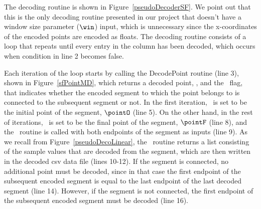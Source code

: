 \vspace{+5pt}



\clearpage




\vspace{-5pt}


The decoding routine is shown in Figure~\ref{pseudoDecoderSF}. We point out that this is the only decoding routine presented in our project that doesn't have a window size parameter ($\win$) input, which is unnecessary since the x-coordinates of the encoded points are encoded as floats. The decoding routine consists of a loop that repeats until every entry in the column has been decoded, which occurs when condition in line 2 becomes false. 





Each iteration of the loop starts by calling the DecodePoint routine (line 3), shown in Figure~\ref{sfPointMD}, which returns a decoded point, \pointP, and the \connected\ flag, that indicates whether the encoded segment to which the point belongs to is connected to the subsequent segment or not.  In the first iteration, \pointP\ is set to be the initial point of the segment, $\pointO$ (line 5). On the other hand, in the rest of iterations, \pointP\ is set to be the final point of the segment, $\pointF$ (line 8), and the \decodeSegment\ routine is called with both endpoints of the segment as inputs (line 9). As we recall from Figure~\ref{pseudoDecoLinear}, the \decodeSegment\ routine returns a list consisting of the sample values that are decoded from the segment, which are then written in the decoded csv data file (lines 10-12). If the segment is connected, no additional point must be decoded, since in that case the first endpoint of the subsequent encoded segment is equal to the last endpoint of the last decoded segment (line 14). However, if the segment is not connected, the first endpoint of the subsequent encoded segment must be decoded (line 16).


\vspace{-3pt}


        



